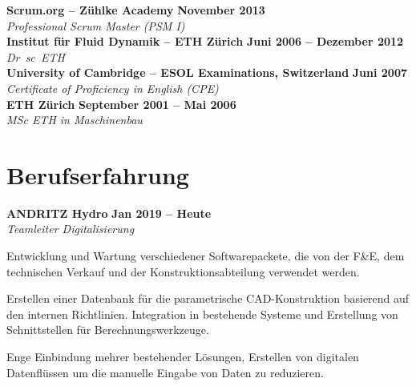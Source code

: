 \documentclass[line,11pt,a4paper]{../resume}
\begin{document}
\begin{resume}
\textbf{Scrum.org -- Zühlke Academy} \hfill \textbf{November 2013}%
\vspace{2mm}\\\vspace{1mm}%
\textsl{Professional Scrum Master (PSM I)}%
\vspace{2mm}\\\vspace{-1mm}%
%
\textbf{Institut für Fluid Dynamik -- ETH Zürich} \hfill \textbf{Juni 2006 -- Dezember 2012}%
\vspace{2mm}\\\vspace{1mm}%
\textsl{Dr\ sc\ ETH}%
\vspace{2mm}\\\vspace{-1mm}%
%
\textbf{University of Cambridge -- ESOL Examinations, Switzerland} \hfill \textbf{Juni 2007}%
\vspace{2mm}\\\vspace{1mm}%
\textsl{Certificate of Proficiency in English (CPE)}%
\vspace{2mm}\\\vspace{-1mm}%
%
\textbf{ETH Zürich} \hfill \textbf{September 2001 -- Mai 2006}%
\vspace{2mm}\\\vspace{1mm}%
\textsl{MSc ETH in Maschinenbau}%
\vspace{-3mm}\\\vspace{-1mm}%

\section{\mysidestyle Berufserfahrung}\vspace{2mm}

\textbf{ANDRITZ Hydro} \hfill \textbf{Jan 2019 -- Heute}
\vspace{2mm}\\\vspace{1mm}%
\textsl{Teamleiter Digitalisierung}
\begin{list2}
  \item Entwicklung und Wartung verschiedener Softwarepackete, die von der F\&E,
    dem technischen Verkauf und der Konstruktionsabteilung verwendet werden.
  \item Erstellen einer Datenbank für die parametrische CAD-Konstruktion
    basierend auf den internen Richtlinien. Integration in bestehende Systeme
    und Erstellung von Schnittstellen für Berechnungswerkzeuge.
  \item Enge Einbindung mehrer bestehender Lösungen, Erstellen von digitalen
    Datenflüssen um die manuelle Eingabe von Daten zu reduzieren.
\end{list2}



\end{resume}
\end{document}
